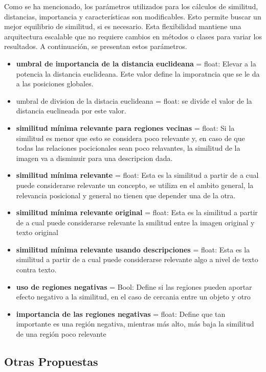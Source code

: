 Como se ha mencionado, los parámetros utilizados para los cálculos de similitud, distancias, importancia y características son modificables. Esto permite buscar un mejor equilibrio de similitud, si es necesario. Esta flexibilidad mantiene una arquitectura escalable que no requiere cambios en métodos o clases para variar los resultados. A continuación, se presentan estos parámetros.
\begin{itemize}
    \item \textbf{umbral de importancia de la distancia euclideana} = float: Elevar a la potencia la distancia euclideana. Este valor define la imporatncia que se le da a las posiciones globales.
    \item umbral de division de la distacia euclideana = float: se divide el valor de la distancia euclineada por este valor.
    \item \textbf{similitud m\'inima relevante para regiones vecinas} = float: Si la similitud es menor que esto se considera poco relevante y, en caso de que todas las relaciones pocicionales sean poco relavantes, la similitud de la imagen va a disminuir para una descripcion dada.
    \item \textbf{similitud m\'inima relevante} = float: Esta es la similitud a partir de a cual puede considerarse relevante un concepto, se utiliza en el ambito general, la relevancia posicional y general no tienen que depender una de la otra.
    \item \textbf{similitud m\'inima relevante original} = float: Esta es la similitud a partir de a cual puede considerarse relevante la smilitud entre la imagen original y texto original
    \item \textbf{similitud m\'inima relevante usando descripciones} = float: Esta es la similitud a partir de a cual puede considerarse relevante algo a nivel de texto contra texto. 
    \item \textbf{uso de regiones negativas} = Bool: Define si las regiones pueden aportar efecto negativo a la similitud, en el caso de cercania entre un objeto y otro
    \item \textbf{importancia de las regiones negativas} = float: Define que tan importante es una regi\'on negativa, mientras m\'as alto, m\'as baja la similitud de una regi\'on poco relevante
\end{itemize}

\subsection*{Otras Propuestas}

